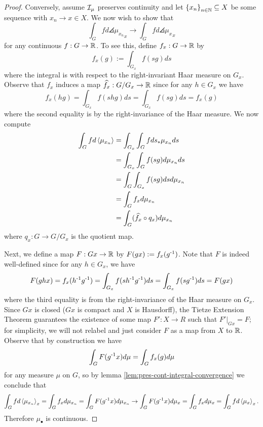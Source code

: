 \begin{theorem}
\begin{proof}
        Conversely, assume $\mathcal{I}_\mu$ preserves continuity and let $\left\{ x_n \right\}_{n \in \mathbb{N}} \subseteq X$ be some sequence with $x_n \to x \in X$.
        We now wish to show that
        \[
            \int_G f d\angles{\mu_{x_n}}_x 
            \to \int_G f d\angles{\mu_x}_x
        \]
        for any continuous $f : G \to \mathbb{R}$.
        To see this, define $f_x : G \to \mathbb{R}$ by
        \[
            f_x (g) := \int_{G_x} f(sg) ds
        \]
        where the integral is with respect to the right-invariant Haar measure on $G_x$.
        Observe that $f_x$ induces a map $\widehat{f_x} : G/G_x \to \mathbb{R}$ since for any $h \in G_x$ we have
        \[
            f_x(hg)
            = \int_{G_x} f(shg) ds
            = \int_{G_x} f(sg) ds
            = f_x(g)
        \]
        where the second equality is by the right-invariance of the Haar measure.
        We now compute
        \begin{align*}
            \int_G f d \left\langle \mu_{x_n} \right\rangle
            &= \int_{G_x} \int_G f d s_* \mu_{x_n} ds \\
            &= \int_{G_x} \int_G f(sg) d \mu_{x_n} ds \\
            &= \int_G \int_{G_x} f(sg) ds d \mu_{x_n} \\
            &= \int_G f_x d \mu_{x_n} \\
            &= \int_G (\widehat{f_x} \circ q_x) d \mu_{x_n}
        \end{align*}
        where $q_x : G \to G/G_x$ is the quotient map.
        
        Next, we define a map $F : Gx \to \mathbb{R}$ by $F(gx) := f_x(g^{\text{-}1})$.
        Note that $F$ is indeed well-defined since for any $h \in G_x$, we have
        \[
            F(ghx)
            = f_x (h^{\text{-}1}g^{\text{-}1})
            = \int_{G_x} f(s h^{\text{-}1} g^{\text{-}1}) ds
            = \int_{G_x} f(s g^{\text{-}1}) ds
            = F(gx)
        \]
        where the third equality is from the right-invariance of the Haar measure on $G_x$.
        Since $Gx$ is closed ($Gx$ is compact and $X$ is Hausdorff), the Tietze Extension Theorem guarantees the existence of some map $F' : X \to R$ such that $F'|_{Gx} = F$; for simplicity, we will not relabel and just consider $F$ as a map from $X$ to $\mathbb{R}$.
        Observe that by construction we have
        \[
            \int_G F(g^{\text{-}1}x) d \mu
            = \int_G f_x (g) d \mu
        \]
        for any measure $\mu$ on $G$, so by lemma \ref{lem:pres-cont-integral-convergence} we conclude that
        \[
            \int_G f d\left\langle \mu_{x_n} \right\rangle_x
            = \int_G f_x d \mu_{x_n}
            = \int_G F(g^{\text{-}1}x) d \mu_{x_n}
            \to \int_G F(g^{\text{-}1}x) d \mu_{x}
            = \int_G f_x d \mu_x
            = \int_G f d \left\langle \mu_{x} \right\rangle_x.
            \]
        Therefore $\mu_\bullet$ is continuous.
    \end{proof}
\end{theorem}


